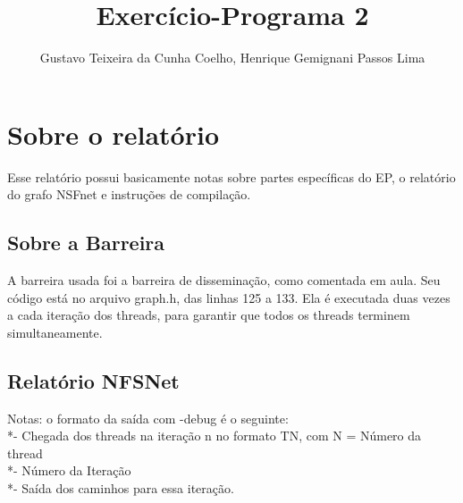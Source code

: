 \documentclass[11pt]{article} %
\title{Exercício-Programa 2}
\author{Gustavo Teixeira da Cunha Coelho, Henrique Gemignani Passos Lima}
\begin{document}
\maketitle

\section{Sobre o relatório}

Esse relatório possui basicamente notas sobre partes específicas do EP, o relatório do grafo NSFnet e instruções de compilação.

\subsection{Sobre a Barreira}
A barreira usada foi a barreira de disseminação, como comentada em aula. Seu código está no arquivo graph.h, das linhas 125 a 133. Ela é executada duas vezes a cada iteração dos threads, para garantir que todos os threads terminem simultaneamente.

\subsection{Relatório NFSNet}
Notas: o formato da saída com -debug é o seguinte:
\\*- Chegada dos threads na iteração n no formato TN, com N = Número da thread
\\*- Número da Iteração
\\*- Saída dos caminhos para essa iteração.
\end{document}
